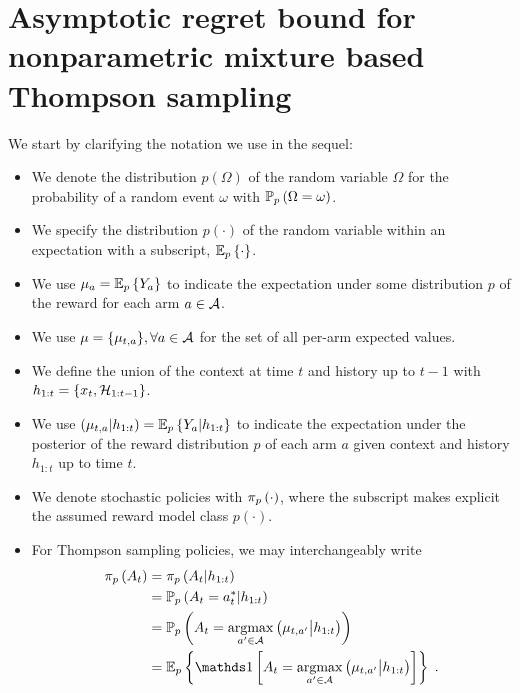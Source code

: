 \section{Asymptotic regret bound for nonparametric mixture based Thompson sampling}
\label{asec:nonparametric_thompson_sampling_regret_bound}

We start by clarifying the notation we use in the sequel:
\begin{itemize}
	\item We denote the distribution $p(\Omega)$ of the random variable $\Omega$ for the probability of a random event $\omega$ with $\mathbb{P}_{p}\left( \Omega=\omega \right)$.
	\item We specify the distribution $p(\cdot)$ of the random variable within an expectation with a subscript, $\mathbb{E}_{p}\left\{ \cdot \right\}$.
	\item We use $\mu_{a}=\mathbb{E}_{p}\left\{ Y_{a} \right\}$ to indicate the expectation under some distribution $p$ of the reward for each arm $a\in\mathcal{A}$.
	\item We use $\mu=\{\mu_{t,a}\}, \forall a\in \mathcal{A}$ for the set of all per-arm expected values.
	\item We define the union of the context at time $t$ and history up to $t-1$ with $h_{1:t}=\{x_t,\mathcal{H}_{1:t-1}\}$.
	\item We use $(\mu_{t,a}|h_{1:t})=\mathbb{E}_{p}\left\{ Y_{a}|h_{1:t} \right\}$ to indicate the expectation under the posterior of the reward distribution $p$ of each arm $a$ given context and history $h_{1:t}$ up to time $t$.
	\item We denote stochastic policies with $\pi_{p}\left( \cdot \right)$, where the subscript makes explicit the assumed reward model class $p(\cdot)$.
	\item For Thompson sampling policies, we may interchangeably write
\begin{align}
	\myPi{p}{A_t} &= \myPi{p}{A_t|h_{1:t}} \\
	&= \myProb{p}{A_t=a_{t}^*|h_{1:t}} \nonumber \\
	&=\myProb{p}{A_t=\argmax_{a^\prime \in \A} \left(\mu_{t,a^\prime} \big| h_{1:t}\right)} \nonumber \\ 
	& =\eValue{p}{\myind{A_t=\argmax_{a^\prime \in \A} \left(\mu_{t,a^\prime} \big| h_{1:t}\right) }} \nonumber \;.
\end{align}
	

\end{itemize}
